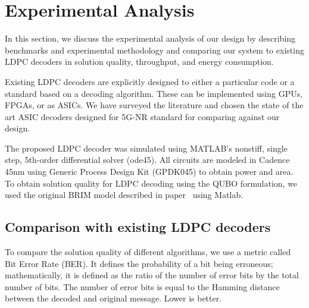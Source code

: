 \section{Experimental Analysis}
\label{sec:evaluations}

In this section, we discuss the experimental analysis of our design by describing benchmarks and experimental methodology and comparing our system to existing LDPC decoders in solution quality, throughput, and energy consumption. 

Existing LDPC decoders are explicitly designed to either a particular code or a standard based on a decoding algorithm. These can be implemented using GPUs, FPGAs, or as ASICs. We have surveyed the literature and chosen the state of the art ASIC decoders designed for 5G-NR standard for comparing against our design.


The proposed LDPC decoder was simulated using MATLAB’s nonstiff, single step, 5th-order differential solver (ode45). All circuits are modeled in Cadence 45nm using Generic Process Design Kit (GPDK045) to obtain power and area. To obtain solution quality for LDPC decoding using the QUBO formulation, we used the original BRIM model described in paper~\cite{afoakwa.hpca21} using Matlab.

\subsection{Comparison with existing LDPC decoders }

To compare the solution quality of different algorithms, we use a metric called Bit Error Rate (BER). It defines the probability of a bit being erroneous; mathematically, it is defined as the ratio of the number of error bits by the total number of bits. The number of error bits is equal to the Hamming distance between the decoded and original message. Lower is better.


